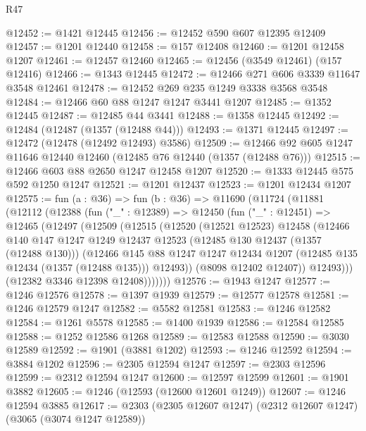 \begin{lexlean}{R47}
\begin{coremodule}
@12452 := @1421 @12445
@12456 := @12452 @590 @607 @12395 @12409
@12457 := @1201 @12440
@12458 := @157 @12408
@12460 := @1201 @12458 @1207
@12461 := @12457 @12460
@12465 := @12456 (@3549 @12461) (@157 @12416)
@12466 := @1343 @12445
@12472 := @12466 @271 @606 @3339 @11647 @3548 @12461
@12478 := @12452 @269 @235 @1249 @3338 @3568 @3548
@12484 := @12466 @60 @88 @1247 @1247 @3441 @1207
@12485 := @1352 @12445
@12487 := @12485 @44 @3441
@12488 := @1358 @12445
@12492 := @12484 (@12487 (@1357 (@12488 @44)))
@12493 := @1371 @12445
@12497 := @12472 (@12478 (@12492 @12493) @3586)
@12509 := @12466 @92 @605 @1247 @11646 @12440 @12460 (@12485 @76 @12440 (@1357 (@12488 @76)))
@12515 := @12466 @603 @88 @2650 @1247 @12458 @1207
@12520 := @1333 @12445 @575 @592 @1250 @1247
@12521 := @1201 @12437
@12523 := @1201 @12434 @1207
@12575 := fun (a : @36) =>
  fun (b : @36) =>
  @11690
    (@11724
      (@11881
        (@12112
          (@12388
            (fun ("_" : @12389) =>
            @12450
              (fun ("_" : @12451) =>
              @12465
                (@12497
                  (@12509
                    (@12515
                      (@12520
                        (@12521 @12523)
                        @12458
                        (@12466
                          @140
                          @147
                          @1247
                          @1249
                          @12437
                          @12523
                          (@12485 @130 @12437 (@1357 (@12488 @130)))
                          (@12466
                            @145
                            @88
                            @1247
                            @1247
                            @12434
                            @1207
                            (@12485 @135 @12434 (@1357 (@12488 @135)))
                            @12493))
                        (@8098 @12402 @12407))
                      @12493)))
                (@12382 @3346 @12398 @12408)))))))
@12576 := @1943 @1247
@12577 := @1246 @12576
@12578 := @1397 @1939
@12579 := @12577 @12578
@12581 := @1246 @12579 @1247
@12582 := @5582 @12581
@12583 := @1246 @12582
@12584 := @1261 @5578
@12585 := @1400 @1939
@12586 := @12584 @12585
@12588 := @1252 @12586 @1268
@12589 := @12583 @12588
@12590 := @3030 @12589
@12592 := @1901 (@3881 @1202)
@12593 := @1246 @12592
@12594 := @3884 @1202
@12596 := @2305 @12594 @1247
@12597 := @2303 @12596
@12599 := @2312 @12594 @1247
@12600 := @12597 @12599
@12601 := @1901 @3882
@12605 := @1246 (@12593 (@12600 @12601 @1249))
@12607 := @1246 @12594 @3885
@12617 := @2303 (@2305 @12607 @1247) (@2312 @12607 @1247) (@3065 (@3074 @1247 @12589))

\end{coremodule}
\end{lexlean}
